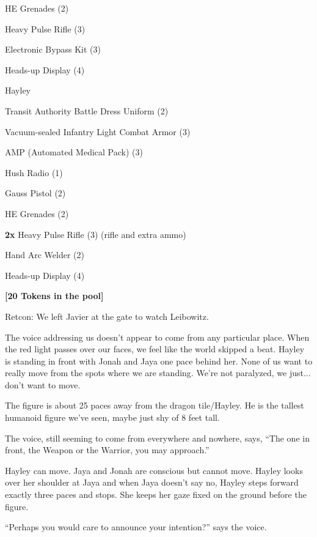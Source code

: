 HE Grenades (2)

Heavy Pulse Rifle (3)

Electronic Bypass Kit (3)

Heads-up Display (4)



Hayley

Transit Authority Battle Dress Uniform (2)

Vacuum-sealed Infantry Light Combat Armor (3)

AMP (Automated Medical Pack) (3)

Hush Radio (1)

Gauss Pistol (2)

HE Grenades (2)

\textbf{2x} Heavy Pulse Rifle (3) (rifle and extra ammo)

Hand Arc Welder (2)

Heads-up Display (4)





\textbf{{[}20 Tokens in the pool{]}}



Retcon: We left Javier at the gate to watch Leibowitz.



The voice addressing us doesn't appear to come from any particular place.  When the red light passes over our faces, we feel like the world skipped a beat.  Hayley is standing in front with Jonah and Jaya one pace behind her.  None of us want to really move from the spots where we are standing.  We're not paralyzed, we just... don't want to move.  



The figure is about 25 paces away from the dragon tile/Hayley.  He is the tallest humanoid figure we've seen, maybe just shy of 8 feet tall.



The voice, still seeming to come from everywhere and nowhere, says, ``The one in front, the Weapon or the Warrior, you may approach.''

Hayley can move.  Jaya and Jonah are conscious but cannot move.  Hayley looks over her shoulder at Jaya and when Jaya doesn't say no, Hayley steps forward exactly three paces and stops.  She keeps her gaze fixed on the ground before the figure.

``Perhaps you would care to announce your intention?'' says the voice.



